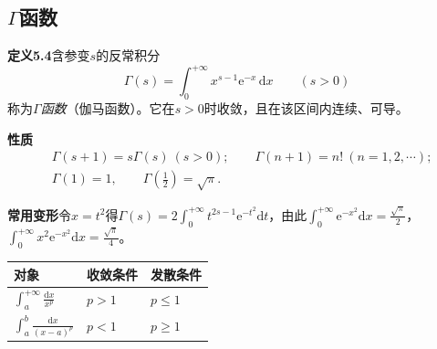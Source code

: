 \subsection{\texorpdfstring{$\Gamma$}{Gamma}函数}

\noindent\textbf{定义5.4}\quad 含参变$s$的反常积分
\[
\Gamma(s)=\int_0^{+\infty}x^{s-1}\mathrm{e}^{-x}\,\mathrm{d}x\qquad(s>0)
\]
称为\emph{$\Gamma$函数}（伽马函数）。它在$s>0$时收敛，且在该区间内连续、可导。

\noindent\textbf{性质}
\begin{align*}
&\Gamma(s+1)=s\Gamma(s)\ (s>0);\qquad \Gamma(n+1)=n!\ (n=1,2,\cdots);\\
&\Gamma(1)=1,\qquad \Gamma\!\left(\tfrac12\right)=\sqrt{\pi}.
\end{align*}

\noindent\textbf{常用变形}\quad 令$x=t^2$得$\Gamma(s)=2\displaystyle\int_0^{+\infty}t^{2s-1}\mathrm{e}^{-t^2}\mathrm{d}t$，由此$\displaystyle\int_0^{+\infty}\mathrm{e}^{-x^2}\mathrm{d}x=\frac{\sqrt{\pi}}{2}$，$\displaystyle\int_0^{+\infty}x^2\mathrm{e}^{-x^2}\mathrm{d}x=\frac{\sqrt{\pi}}{4}$。


\begin{center}
\small
\begin{tabular}{@{}lll@{}}
\toprule
\textbf{对象} & \textbf{收敛条件} & \textbf{发散条件} \\
\midrule
$\int_a^{+\infty}\frac{\mathrm{d}x}{x^p}$ & $p>1$ & $p\le1$ \\
$\int_a^b\frac{\mathrm{d}x}{(x-a)^p}$ & $p<1$ & $p\ge1$ \\
\bottomrule
\end{tabular}
\end{center}
